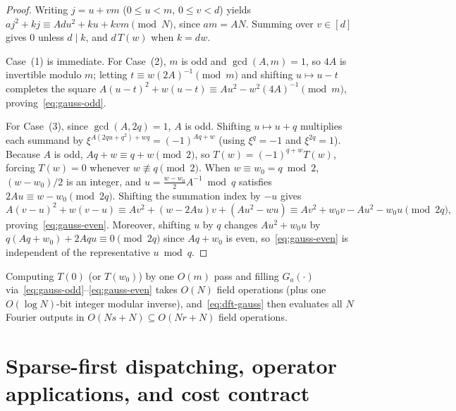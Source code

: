 \documentclass[11pt,reqno]{amsart}
\numberwithin{equation}{section}
\theoremstyle{definition}
\theoremstyle{remark}
\begin{document}
\begin{proof}
Writing $j = u + vm$ ($0\le u<m$, $0\le v<d$) yields $a j^2 + kj \equiv A d u^2 + k u + k v m\pmod N$, since $a m = A N$. Summing over $v\in[d]$ gives $0$ unless $d\mid k$, and $d\,T(w)$ when $k = dw$.

Case~(1) is immediate. For Case~(2), $m$ is odd and $\gcd(A,m)=1$, so $4A$ is invertible modulo $m$; letting $t \equiv w(2A)^{-1}\pmod m$ and shifting $u \mapsto u - t$ completes the square $A(u-t)^2 + w(u-t) \equiv Au^2 - w^2(4A)^{-1}\pmod m$, proving~\eqref{eq:gauss-odd}.

For Case~(3), since $\gcd(A,2q)=1$, $A$ is odd. Shifting $u\mapsto u+q$ multiplies each summand by $\xi^{A(2qu+q^2)+wq} = (-1)^{Aq + w}$ (using $\xi^q = -1$ and $\xi^{2q} = 1$). Because $A$ is odd, $Aq + w \equiv q + w\pmod 2$, so $T(w) = (-1)^{q+w} T(w)$, forcing $T(w)=0$ whenever $w\not\equiv q\pmod 2$. When $w\equiv w_0 = q\bmod 2$, $(w - w_0)/2$ is an integer, and $u = \frac{w - w_0}{2}A^{-1}\bmod q$ satisfies $2Au \equiv w - w_0\pmod{2q}$. Shifting the summation index by $-u$ gives
\[
A(v - u)^2 + w(v - u) \equiv Av^2 + (w - 2Au)v + (Au^2 - wu) \equiv Av^2 + w_0 v - Au^2 - w_0 u \pmod{2q},
\]
proving~\eqref{eq:gauss-even}. Moreover, shifting $u$ by $q$ changes $Au^2 + w_0 u$ by $q(Aq + w_0) + 2Aqu \equiv 0\pmod{2q}$ since $Aq + w_0$ is even, so~\eqref{eq:gauss-even} is independent of the representative $u\bmod q$.
\end{proof}

Computing $T(0)$ (or $T(w_0)$) by one $O(m)$ pass and filling $G_a(\cdot)$ via~\eqref{eq:gauss-odd}--\eqref{eq:gauss-even} takes $O(N)$ field operations (plus one $O(\log N)$-bit integer modular inverse), and~\eqref{eq:dft-gauss} then evaluates all $N$ Fourier outputs in $O(Ns + N)\subseteq O(Nr + N)$ field operations.

\section{Sparse-first dispatching, operator applications, and cost contract}
\label{sec:contract}
\end{document}
